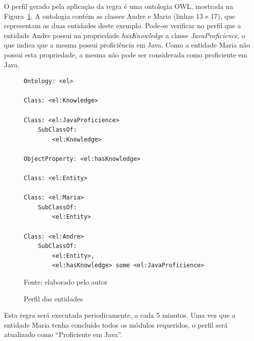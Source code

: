 O perfil gerado pela aplicação da regra é uma ontologia OWL, mostrada na Figura~\ref{fig:perfil_gerado}. A ontologia contém as classes Andre e Maria (linhas 13 e 17), que representam as duas entidades deste exemplo. Pode-se verificar no perfil que a entidade Andre possui na propriedade {\em hasKnowledge} a classe {\em JavaProficience}, o que indica que a mesma possui proficiência em Java. Como a entidade Maria não possui esta propriedade, a mesma não pode ser considerada como proficiente em Java.

\begin{figure}[!t]
\caption{Perfil das entidades}
\begin{lstlisting}
Ontology: <el>

Class: <el:Knowledge>
    
Class: <el:JavaProficience>
    SubClassOf: 
        <el:Knowledge>
    
ObjectProperty: <el:hasKnowledge>
    
Class: <el:Entity>
    
Class: <el:Maria>
    SubClassOf: 
        <el:Entity>
    
Class: <el:Andre>
    SubClassOf: 
        <el:Entity>,
        <el:hasKnowledge> some <el:JavaProficience>\end{lstlisting}
\label{fig:perfil_gerado}

Fonte: elaborado pelo autor
\end{figure}

Esta regra será executada periodicamente, a cada 5 minutos. Uma vez que a entidade Maria tenha concluído todos os módulos requeridos, o perfil será atualizado como ``Proficiente em Java''.
